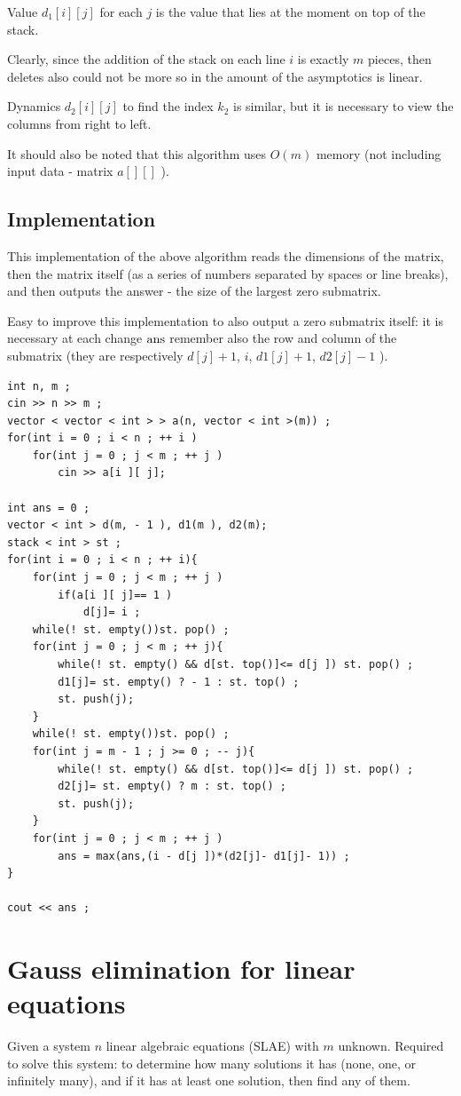 Value $d_1 [i][j]$ for each $j$ is the value that lies at the moment on top of the stack.

Clearly, since the addition of the stack on each line $i$ is exactly $m$ pieces, then deletes also could not be more so in the amount of the asymptotics is linear.

Dynamics $d_2 [i][j]$ to find the index $k_2$ is similar, but it is necessary to view the columns from right to left.

It should also be noted that this algorithm uses $O (m)$ memory (not including input data - matrix $a [][]$ ).

\subsection{ Implementation }

This implementation of the above algorithm reads the dimensions of the matrix, then the matrix itself (as a series of numbers separated by spaces or line breaks), and then outputs the answer - the size of the largest zero submatrix.

Easy to improve this implementation to also output a zero submatrix itself: it is necessary at each change $\rm ans$ remember also the row and column of the submatrix (they are respectively $d [j] +1$, $i$, $d1 [j] +1$, $d2 [j] -1$ ).

\begin{verbatim}
int n, m ;
cin >> n >> m ;
vector < vector < int > > a(n, vector < int >(m)) ;
for(int i = 0 ; i < n ; ++ i )
    for(int j = 0 ; j < m ; ++ j )
        cin >> a[i ][ j];
 
int ans = 0 ;
vector < int > d(m, - 1 ), d1(m ), d2(m);
stack < int > st ;
for(int i = 0 ; i < n ; ++ i){
    for(int j = 0 ; j < m ; ++ j )
        if(a[i ][ j]== 1 )
            d[j]= i ;
    while(! st. empty())st. pop() ;
    for(int j = 0 ; j < m ; ++ j){
        while(! st. empty() && d[st. top()]<= d[j ]) st. pop() ;
        d1[j]= st. empty() ? - 1 : st. top() ;
        st. push(j);
    }
    while(! st. empty())st. pop() ;
    for(int j = m - 1 ; j >= 0 ; -- j){
        while(! st. empty() && d[st. top()]<= d[j ]) st. pop() ;
        d2[j]= st. empty() ? m : st. top() ;
        st. push(j);
    }
    for(int j = 0 ; j < m ; ++ j )
        ans = max(ans,(i - d[j ])*(d2[j]- d1[j]- 1)) ;
}
 
cout << ans ; 
\end{verbatim}

\section{ Gauss elimination for linear equations }
Given a system $n$ linear algebraic equations (SLAE) with $m$ unknown. Required to solve this system: to determine how many solutions it has (none, one, or infinitely many), and if it has at least one solution, then find any of them.

